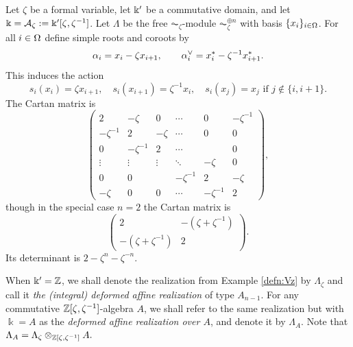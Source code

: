 \begin{example}\cite[Definition 2.8, with $z$ replaced by $\zeta$]{EJY1} \label{defn:Vz} Let $\zeta$ be a formal variable, let $\Bbbk'$ be a commutative domain, and let $\Bbbk = \mathcal{A}_{\zeta} := \Bbbk'[\zeta,\zeta^{-1}]$. Let $\Lambda$ be the free $\AC_\zeta$-module $\AC_\zeta^{\oplus n}$ with basis $\{x_i\}_{i \in \Omega}$. For all $i \in \Omega$ define simple roots and coroots by
\begin{equation} \alpha_i = x_i - \zeta x_{i+1}, \qquad \alpha_i^\vee = x_i^* - \zeta^{-1} x_{i+1}^*. \end{equation}
This induces the action
\begin{equation} \label{zetarefrep} s_i(x_i) = \zeta x_{i+1}, \quad s_i(x_{i+1}) = \zeta^{-1} x_i, \quad s_i(x_j) = x_j \text{ if } j \notin \{i,i+1\}. \end{equation}
The Cartan matrix is
\begin{equation} \label{slnzeCartan} \left( \begin{array}{cccccc}
2 & -\zeta & 0 & \cdots & 0 & -\zeta^{-1} \\
-\zeta^{-1} & 2 & -\zeta & \cdots & 0 & 0 \\
0 & -\zeta^{-1} & 2 & \cdots &  & 0 \\
\vdots & \vdots & \vdots & \ddots & -\zeta & 0 \\
0 & 0 &   & -\zeta^{-1} & 2 & -\zeta \\
-\zeta & 0 & 0 & \cdots & -\zeta^{-1} & 2
\end{array} \right), \end{equation}
though in the special case $n=2$ the Cartan matrix is
\begin{equation} \label{sl2zeCartan} \left( \begin{array}{cc}
2 & -(\zeta+\zeta^{-1}) \\
-(\zeta+\zeta^{-1}) & 2 \end{array} \right). \end{equation}
Its determinant is $2 - \zeta^n - \zeta^{-n}$.
\end{example} 
\begin{defn}\label{defn-deformed affine realization}
When $\Bbbk'=\mathbb{Z}$, we shall denote the realization from Example \ref{defn:Vz} by $\Lambda_{\zeta}$ and call it \emph{the (integral) deformed affine realization} of type $A_{n-1}$. 
For any commutative $\mathbb{Z}[\zeta,\zeta^{-1}]$-algebra $A$, we shall refer to the same realization but with $\Bbbk = A$ as the \emph{deformed affine realization over $A$}, and denote it by $\Lambda_A$. Note that $\Lambda_A=\Lambda_{\zeta}\otimes_{\mathbb{Z}[\zeta,\zeta^{-1}]} A.$
\end{defn}


